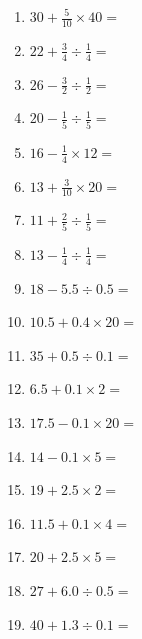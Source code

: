 \documentclass[12pt]{article}
\begin{document}
\begin{enumerate}
\item \large $ 30 + \frac{5}{10} \times 40 = $ \vspace{1.6cm}
\item \large $ 22 + \frac{3}{4} \div \frac{1}{4} = $ \vspace{1.6cm}
\item \large $ 26 - \frac{3}{2} \div \frac{1}{2} = $ \vspace{1.6cm}
\newpage
\item \large $ 20 - \frac{1}{5} \div \frac{1}{5} = $ \vspace{1.6cm}
\item \large $ 16 - \frac{1}{4} \times 12 = $ \vspace{1.6cm}
\item \large $ 13 + \frac{3}{10} \times 20 = $ \vspace{1.6cm}
\item \large $ 11 + \frac{2}{5} \div \frac{1}{5} = $ \vspace{1.6cm}
\item \large $ 13 - \frac{1}{4} \div \frac{1}{4} = $ \vspace{1.6cm}
\item \large $ 18 - 5.5 \div 0.5 = $ \vspace{1.6cm}
\item \large $ 10.5 + 0.4 \times 20 = $ \vspace{1.6cm}
\item \large $ 35 + 0.5 \div 0.1 = $ \vspace{1.6cm}
\item \large $ 6.5 + 0.1 \times 2 = $ \vspace{1.6cm}
\item \large $ 17.5 - 0.1 \times 20 = $ \vspace{1.6cm}
\newpage
\item \large $ 14 - 0.1 \times 5 = $ \vspace{1.6cm}
\item \large $ 19 + 2.5 \times 2 = $ \vspace{1.6cm}
\item \large $ 11.5 + 0.1 \times 4 = $ \vspace{1.6cm}
\item \large $ 20 + 2.5 \times 5 = $ \vspace{1.6cm}
\item \large $ 27 + 6.0 \div 0.5 = $ \vspace{1.6cm}
\item \large $ 40 + 1.3 \div 0.1 = $ \vspace{1.6cm}

\end{enumerate}
\end{document}
